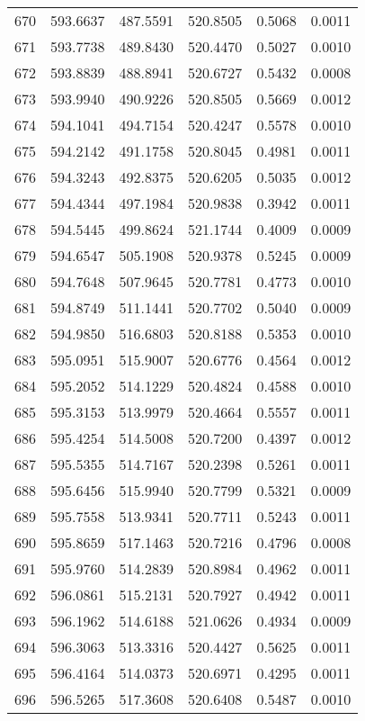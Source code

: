 \documentclass{article}
\begin{document}
\begin{longtable}{|c|c|c|c|c|c|}
670 & 593.6637 & 487.5591 & 520.8505 & 0.5068 & 0.0011 \\
671 & 593.7738 & 489.8430 & 520.4470 & 0.5027 & 0.0010 \\
672 & 593.8839 & 488.8941 & 520.6727 & 0.5432 & 0.0008 \\
673 & 593.9940 & 490.9226 & 520.8505 & 0.5669 & 0.0012 \\
674 & 594.1041 & 494.7154 & 520.4247 & 0.5578 & 0.0010 \\
675 & 594.2142 & 491.1758 & 520.8045 & 0.4981 & 0.0011 \\
676 & 594.3243 & 492.8375 & 520.6205 & 0.5035 & 0.0012 \\
677 & 594.4344 & 497.1984 & 520.9838 & 0.3942 & 0.0011 \\
678 & 594.5445 & 499.8624 & 521.1744 & 0.4009 & 0.0009 \\
679 & 594.6547 & 505.1908 & 520.9378 & 0.5245 & 0.0009 \\
680 & 594.7648 & 507.9645 & 520.7781 & 0.4773 & 0.0010 \\
681 & 594.8749 & 511.1441 & 520.7702 & 0.5040 & 0.0009 \\
682 & 594.9850 & 516.6803 & 520.8188 & 0.5353 & 0.0010 \\
683 & 595.0951 & 515.9007 & 520.6776 & 0.4564 & 0.0012 \\
684 & 595.2052 & 514.1229 & 520.4824 & 0.4588 & 0.0010 \\
685 & 595.3153 & 513.9979 & 520.4664 & 0.5557 & 0.0011 \\
686 & 595.4254 & 514.5008 & 520.7200 & 0.4397 & 0.0012 \\
687 & 595.5355 & 514.7167 & 520.2398 & 0.5261 & 0.0011 \\
688 & 595.6456 & 515.9940 & 520.7799 & 0.5321 & 0.0009 \\
689 & 595.7558 & 513.9341 & 520.7711 & 0.5243 & 0.0011 \\
690 & 595.8659 & 517.1463 & 520.7216 & 0.4796 & 0.0008 \\
691 & 595.9760 & 514.2839 & 520.8984 & 0.4962 & 0.0011 \\
692 & 596.0861 & 515.2131 & 520.7927 & 0.4942 & 0.0011 \\
693 & 596.1962 & 514.6188 & 521.0626 & 0.4934 & 0.0009 \\
694 & 596.3063 & 513.3316 & 520.4427 & 0.5625 & 0.0011 \\
695 & 596.4164 & 514.0373 & 520.6971 & 0.4295 & 0.0011 \\
696 & 596.5265 & 517.3608 & 520.6408 & 0.5487 & 0.0010 \\

\end{longtable}
\end{document}

